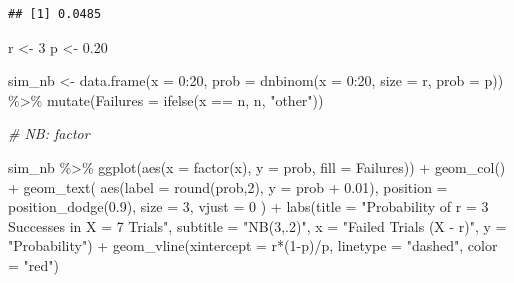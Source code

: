 \documentclass[
  10pt,
]{article}
\newenvironment{Shaded}{\begin{snugshade}}{\end{snugshade}}
\newcommand{\AttributeTok}[1]{\textcolor[rgb]{0.77,0.63,0.00}{#1}}
\newcommand{\CommentTok}[1]{\textcolor[rgb]{0.56,0.35,0.01}{\textit{#1}}}
\newcommand{\DecValTok}[1]{\textcolor[rgb]{0.00,0.00,0.81}{#1}}
\newcommand{\FloatTok}[1]{\textcolor[rgb]{0.00,0.00,0.81}{#1}}
\newcommand{\FunctionTok}[1]{\textcolor[rgb]{0.00,0.00,0.00}{#1}}
\newcommand{\NormalTok}[1]{#1}
\newcommand{\OtherTok}[1]{\textcolor[rgb]{0.56,0.35,0.01}{#1}}
\newcommand{\SpecialCharTok}[1]{\textcolor[rgb]{0.00,0.00,0.00}{#1}}
\newcommand{\StringTok}[1]{\textcolor[rgb]{0.31,0.60,0.02}{#1}}
\begin{document}
\begin{verbatim}
## [1] 0.0485
\end{verbatim}

\newpage

\begin{Shaded}
\begin{Highlighting}[]
\NormalTok{r }\OtherTok{\textless{}{-}} \DecValTok{3}
\NormalTok{p }\OtherTok{\textless{}{-}} \FloatTok{0.20}

\NormalTok{sim\_nb }\OtherTok{\textless{}{-}} \FunctionTok{data.frame}\NormalTok{(}\AttributeTok{x =} \DecValTok{0}\SpecialCharTok{:}\DecValTok{20}\NormalTok{, }\AttributeTok{prob =} \FunctionTok{dnbinom}\NormalTok{(}\AttributeTok{x =} \DecValTok{0}\SpecialCharTok{:}\DecValTok{20}\NormalTok{, }\AttributeTok{size =}\NormalTok{ r, }\AttributeTok{prob =}\NormalTok{ p)) }\SpecialCharTok{\%\textgreater{}\%}
  \FunctionTok{mutate}\NormalTok{(}\AttributeTok{Failures =} \FunctionTok{ifelse}\NormalTok{(x }\SpecialCharTok{==}\NormalTok{ n, n, }\StringTok{"other"}\NormalTok{)) }

\CommentTok{\# NB: factor}

\NormalTok{sim\_nb }\SpecialCharTok{\%\textgreater{}\%}
\FunctionTok{ggplot}\NormalTok{(}\FunctionTok{aes}\NormalTok{(}\AttributeTok{x =} \FunctionTok{factor}\NormalTok{(x), }\AttributeTok{y =}\NormalTok{ prob, }\AttributeTok{fill =}\NormalTok{ Failures)) }\SpecialCharTok{+}
  \FunctionTok{geom\_col}\NormalTok{() }\SpecialCharTok{+}
  \FunctionTok{geom\_text}\NormalTok{(}
    \FunctionTok{aes}\NormalTok{(}\AttributeTok{label =} \FunctionTok{round}\NormalTok{(prob,}\DecValTok{2}\NormalTok{), }\AttributeTok{y =}\NormalTok{ prob }\SpecialCharTok{+} \FloatTok{0.01}\NormalTok{),}
    \AttributeTok{position =} \FunctionTok{position\_dodge}\NormalTok{(}\FloatTok{0.9}\NormalTok{),}
    \AttributeTok{size =} \DecValTok{3}\NormalTok{,}
    \AttributeTok{vjust =} \DecValTok{0}
\NormalTok{  ) }\SpecialCharTok{+}
  \FunctionTok{labs}\NormalTok{(}\AttributeTok{title =} \StringTok{"Probability of r = 3 Successes in X = 7 Trials"}\NormalTok{,}
       \AttributeTok{subtitle =} \StringTok{"NB(3,.2)"}\NormalTok{,}
       \AttributeTok{x =} \StringTok{"Failed Trials (X {-} r)"}\NormalTok{,}
       \AttributeTok{y =} \StringTok{"Probability"}\NormalTok{)  }\SpecialCharTok{+}
  \FunctionTok{geom\_vline}\NormalTok{(}\AttributeTok{xintercept =}\NormalTok{ r}\SpecialCharTok{*}\NormalTok{(}\DecValTok{1}\SpecialCharTok{{-}}\NormalTok{p)}\SpecialCharTok{/}\NormalTok{p, }\AttributeTok{linetype =} \StringTok{"dashed"}\NormalTok{, }\AttributeTok{color =} \StringTok{"red"}\NormalTok{)}
\end{Highlighting}
\end{Shaded}
\end{document}
